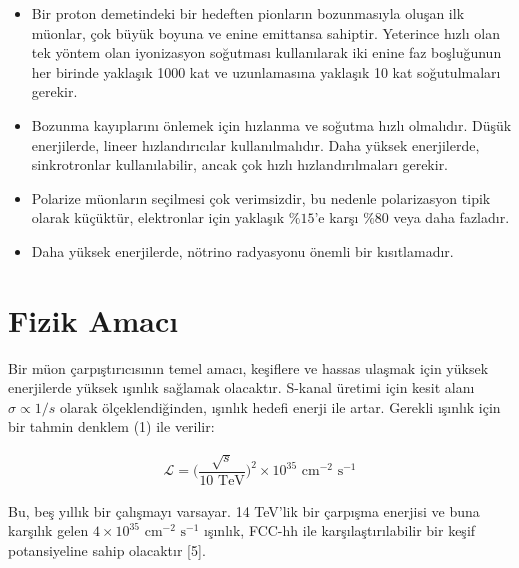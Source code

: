 \documentclass{article}
\begin{document}
\begin{itemize}
    \item Bir proton demetindeki bir hedeften pionların bozunmasıyla oluşan ilk müonlar, çok büyük boyuna ve enine emittansa sahiptir. Yeterince hızlı olan tek yöntem olan iyonizasyon soğutması kullanılarak iki enine faz boşluğunun her birinde yaklaşık 1000 kat ve uzunlamasına yaklaşık 10 kat soğutulmaları gerekir.
\end{itemize}

\begin{itemize}
    \item Bozunma kayıplarını önlemek için hızlanma ve soğutma hızlı olmalıdır. Düşük enerjilerde, lineer hızlandırıcılar kullanılmalıdır. Daha yüksek enerjilerde, sinkrotronlar kullanılabilir, ancak çok hızlı hızlandırılmaları gerekir.
\end{itemize}

\begin{itemize}
    \item Polarize müonların seçilmesi çok verimsizdir, bu nedenle polarizasyon tipik olarak küçüktür, elektronlar için yaklaşık $ \%15 $'e karşı $ \% 80 $ veya daha fazladır.
\end{itemize}

\begin{itemize}
    \item Daha yüksek enerjilerde, nötrino radyasyonu önemli bir kısıtlamadır.
\end{itemize}

\newpage

\section{Fizik Amacı}

Bir müon çarpıştırıcısının temel amacı, keşiflere ve hassas ulaşmak için yüksek enerjilerde yüksek ışınlık sağlamak olacaktır. S-kanal üretimi için kesit alanı $\sigma \propto 1/s $ olarak ölçeklendiğinden, ışınlık hedefi enerji ile artar. Gerekli ışınlık için bir tahmin denklem (1) ile verilir:

\begin{align}
    \mathcal{L} = \Big( \dfrac{\sqrt{s}}{10 \textrm{ TeV}} \Big)^{2} \times 10^{35} \textrm{ cm}^{-2} \textrm{ s}^{-1}
\end{align}

Bu, beş yıllık bir çalışmayı varsayar. 14 TeV'lik bir çarpışma enerjisi ve buna karşılık gelen $4 \times 10^{35} \textrm{ cm}^{-2} \textrm{ s}^{-1}$ ışınlık, FCC-hh ile karşılaştırılabilir bir keşif potansiyeline sahip olacaktır [5].
\end{document}

